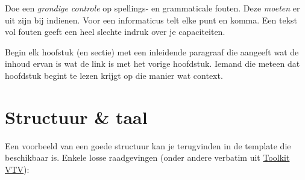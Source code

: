 Doe een \emph{grondige controle} op spellings- en grammaticale fouten. Deze \emph{moeten} er uit zijn bij indienen. Voor een informaticus telt elke punt en komma. Een tekst vol fouten geeft een heel slechte indruk over je capaciteiten.

Begin elk hoofstuk (en sectie) met een inleidende paragraaf die aangeeft wat de inhoud ervan is wat de link is met het vorige hoofdstuk. Iemand die meteen dat hoofdstuk begint te lezen krijgt op die manier wat context.




%

\section{Structuur \& taal}
\label{sec:structuur-taal}
Een voorbeeld van een goede structuur kan je terugvinden in de template die beschikbaar is. Enkele losse raadgevingen (onder andere verbatim uit \href{http://www.toolkitvtv.nl/organisatie-en-proces/redactierichtlijnen/heldere-taal-gebruiken/index.html#Objectiefformuleren}{Toolkit VTV}):

